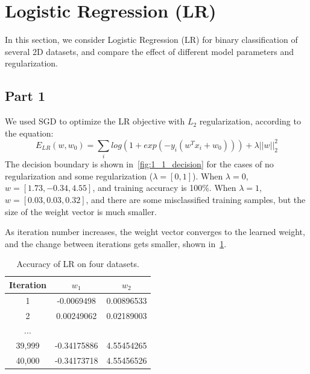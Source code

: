 \section{Logistic Regression (LR)} \label{sec:prob1}
In this section, we consider Logistic Regression (LR) for binary classification of several 2D datasets, and compare the effect of different model parameters and regularization.

\subsection{Part 1}
We used SGD to optimize the LR objective with $L_2$ regularization, according to the equation:
\begin{equation}
E_{LR}(w,w_0) = \sum\limits_{i}log(1+exp(-y_i(w^Tx_i+w_0))) + \lambda||w||^2_2
\end{equation}
The decision boundary is shown in~\cref{fig:1_1_decision} for the cases of no regularization and some regularization ($\lambda=[0, 1]$).
When $\lambda=0$, $w=[1.73, -0.34, 4.55]$, and training accuracy is 100\%.
When $\lambda=1$, $w=[0.03, 0.03, 0.32]$, and there are some misclassified training samples, but the size of the weight vector is much smaller.

As iteration number increases, the weight vector converges to the learned weight, and the change between iterations gets smaller, shown in~\cref{table_lr_1_1}.

\begin{table}[ht!]
\centering
\begin{tabular}{||c c c||}  
 \hline
 Iteration & $w_1$ & $w_2$  \\ [0.3ex] 
 \hline\hline
 1 & -0.0069498 & 0.00896533 \\ 
 \hline
 2 & 0.00249062 & 0.02189003 \\ 
 \hline
 ... & & \\
 \hline
 39,999 & -0.34175886 & 4.55454265 \\ 
 \hline
 40,000 & -0.34173718 & 4.55456526 \\ 
 \hline
\end{tabular}
\caption{Accuracy of LR on four datasets.}
\label{table_lr_1_1}
\end{table}

